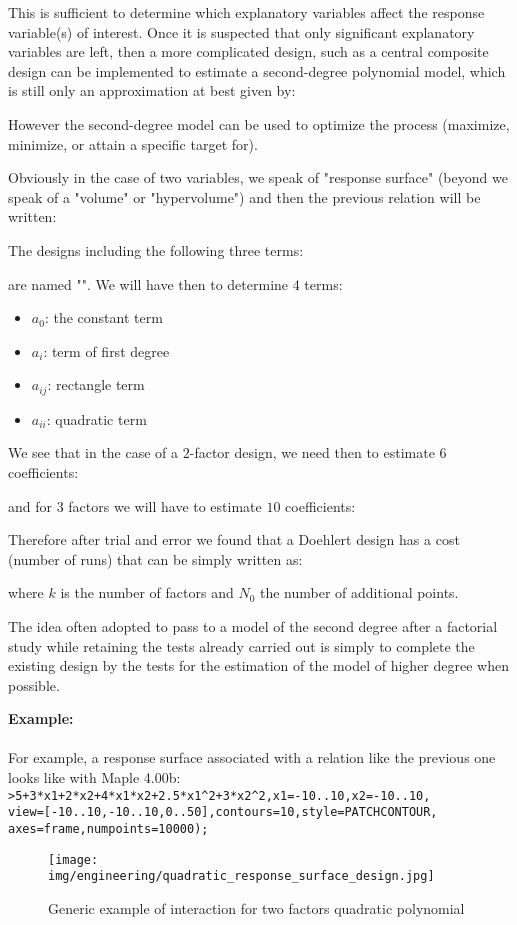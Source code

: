 	This is sufficient to determine which explanatory variables affect the response variable(s) of interest. Once it is suspected that only significant explanatory variables are left, then a more complicated design, such as a central composite design can be implemented to estimate a second-degree polynomial model, which is still only an approximation at best given by:
			
	However the second-degree model can be used to optimize the process (maximize, minimize, or attain a specific target for).
	
	Obviously in the case of two variables, we speak of "response surface" (beyond we speak of a "volume" or "hypervolume") and then the previous relation will be written:
	
	The designs including the following three terms:
	
	are named "". We will have then to determine $4$ terms:
	\begin{itemize}
		\item $a_0$: the constant term
		\item $a_i$: term of first degree
		\item $a_{ij}$: rectangle term
		\item $a_{ii}$: quadratic term
	\end{itemize}
	We see that in the case of a $2$-factor design, we need then to estimate $6$ coefficients:
	
 	and for $3$ factors we will have to estimate $10$ coefficients:
	
	Therefore after trial and error we found that a Doehlert design has a cost (number of runs) that can be simply written as:
	
	where $k$ is the number of factors and $N_0$ the number of additional points.
	
	The idea often adopted to pass to a model of the second degree after a factorial study while retaining the tests already carried out is simply to complete the existing design by the tests for the estimation of the model of higher degree when possible.
	\begin{tcolorbox}[colframe=black,colback=white,sharp corners]
	\textbf{{\Large {}}Example:}\\\\
	For example, a response surface associated with a relation like the previous one looks like with Maple 4.00b:\\
	
	\texttt{>5+3*x1+2*x2+4*x1*x2+2.5*x1\string^2+3*x2\string^2,x1=-10..10,x2=-10..10,\\
view=[-10..10,-10..10,0..50],contours=10,style=PATCHCONTOUR,\\
		axes=frame,numpoints=10000);
		}
	\begin{figure}[H]
		\begin{center}
		\texttt{[image: img/engineering/quadratic\_response\_surface\_design.jpg]}
		\end{center}	
		\caption{Generic example of interaction for two factors quadratic polynomial}
	\end{figure}
	\end{tcolorbox}
	
